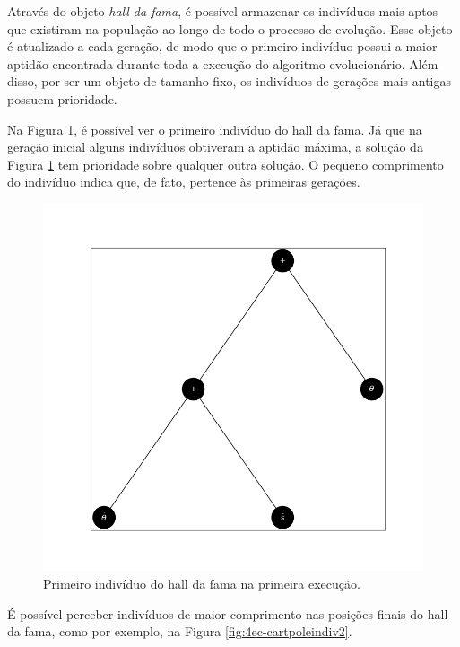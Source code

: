 Através do objeto \textit{hall da fama}, é possível armazenar os indivíduos mais aptos que existiram na população ao longo de todo o processo de evolução. Esse objeto é atualizado a cada geração, de modo que o primeiro indivíduo possui a maior aptidão encontrada durante toda a execução do algoritmo evolucionário. Além disso, por ser um objeto de tamanho fixo, os indivíduos de gerações mais antigas possuem prioridade.

Na Figura \ref{fig:4ec-cartpoleindiv1}, é possível ver o primeiro indivíduo do hall da fama. Já que na geração inicial alguns indivíduos obtiveram a aptidão máxima, a solução da Figura \ref{fig:4ec-cartpoleindiv1} tem prioridade sobre qualquer outra solução. O pequeno comprimento do indivíduo indica que, de fato, pertence às primeiras gerações.

\begin{figure}[H]
	\centering
	\includegraphics[width=\textwidth]{02_desenvolvimento/04_EC_Fig_CartpoleIndiv1.png}
	\caption{Primeiro indivíduo do hall da fama na primeira execução.}
	\label{fig:4ec-cartpoleindiv1}
\end{figure}

É possível perceber indivíduos de maior comprimento nas posições finais do hall da fama, como por exemplo, na Figura \ref{fig:4ec-cartpoleindiv2}.

